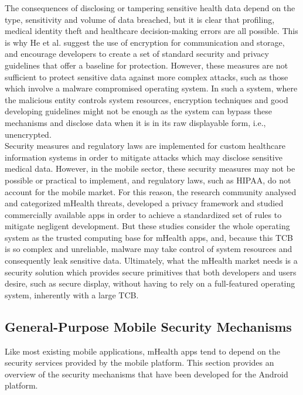 The consequences of disclosing or tampering sensitive health data depend on the type, sensitivity and volume of data breached, but it is clear that profiling, medical identity theft and healthcare decision-making errors are all possible. This is why He et al. suggest the use of encryption for communication and storage, and encourage developers to create a set of standard security and privacy guidelines that offer a baseline for protection. However, these measures are not sufficient to protect sensitive data against more complex attacks, such as those which involve a malware compromised operating system. In such a system, where the malicious entity controls system resources, encryption techniques and good developing guidelines might not be enough as the system can bypass these mechanisms and disclose data when it is in its raw displayable form, i.e., unencrypted.\\

Security measures and regulatory laws are implemented for custom healthcare information systems in order to mitigate attacks which may disclose sensitive medical data. However, in the mobile sector, these security measures may not be possible or practical to implement, and regulatory laws, such as \ac{HIPAA}, do not account for the mobile market. For this reason, the research community analysed and categorized mHealth threats, developed a privacy framework and studied commercially available apps in order to achieve a standardized set of rules to mitigate negligent development. But these studies consider the whole operating system as the trusted computing base for mHealth apps, and, because this \ac{TCB} is so complex and unreliable, malware may take control of system resources and consequently leak sensitive data. Ultimately, what the mHealth market needs is a security solution which provides secure primitives that both developers and users desire, such as secure display, without having to rely on a full-featured operating system, inherently with a large \ac{TCB}.

\subsection{General-Purpose Mobile Security Mechanisms}

Like most existing mobile applications, mHealth apps tend to depend on the security services provided by the mobile platform. This section provides an overview of the security mechanisms that have been developed for the Android platform.

